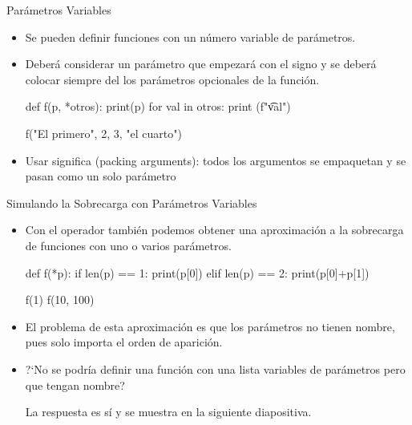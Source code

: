 \documentclass[10pt,envcountsect,spanish]{beamer}
\begin{document}
\begin{frame}[fragile]{Parámetros Variables}

\begin{itemize}
\item Se pueden definir funciones con un número variable de parámetros. 
\item Deberá considerar un parámetro que empezará con el signo \cm{*} y se deberá colocar siempre  del los parámetros opcionales de la función.

{\small 
\begin{pyconsole}[][frame=single]
def f(p, *otros):
    print(p)
    for val in otros:
        print (f"\t{val}")

f("El primero", 2, 3, "el cuarto")
\end{pyconsole}
}

\item Usar \cm{*} significa  (packing arguments): todos los argumentos se empaquetan y se pasan como un solo parámetro
\end{itemize}

\end{frame}




\begin{frame}[fragile]{Simulando la Sobrecarga con Parámetros Variables}

\begin{itemize}
\item Con el operador \cm{*} también podemos obtener una aproximación a la sobrecarga de funciones con uno o varios parámetros.

\begin{pyconsole}[][frame=single]
def f(*p):
    if len(p) == 1:
        print(p[0])
    elif len(p) == 2:
        print(p[0]+p[1])

f(1)
f(10, 100)
\end{pyconsole}

\item El problema de esta aproximación es que los parámetros no tienen nombre, pues solo importa el orden de aparición.

\item ?`No se podría definir una función con una lista variables de parámetros pero que tengan nombre?

La respuesta es sí y se muestra en la siguiente diapositiva.
\end{itemize}

\end{frame}
\end{document}
